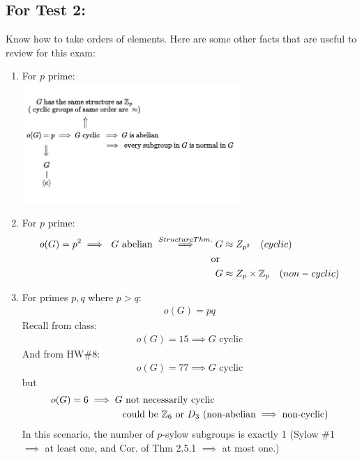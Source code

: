 \subsection*{For Test 2:}
Know how to take orders of elements. Here are some other facts that are useful to review for this exam:
\begin{enumerate}[label=(\arabic*.)]
    \item For $p$ prime: \\ \includegraphics[width=0.65\textwidth]{Figures/prime_order_properties_1.pdf}
    \item For $p$ prime: \\
    \begin{align}
        o(G)=p^2 \implies \ G\text{ abelian }\overset{Structure Thm.}{\implies} G &\approx Z_{p^2} \ \ \ (cyclic)\nonumber \\
        \ \ \ \text{ or } \nonumber \\
        G &\approx Z_{p}\times {\mathbb{ Z}}_{p} \ \ \ (non-cyclic) \nonumber
    \end{align}
    \item For primes $p,q$ where $p>q$: \\
    \begin{align}
        o(G)=pq \nonumber
    \end{align}
    Recall from class:
    \begin{align}
        o(G)=15 \implies G\text{ cyclic}\nonumber
    \end{align}
    And from HW\#8:
    \begin{align}
        o(G)=77\implies G\text{ cyclic}\nonumber
    \end{align}
    but 
    \begin{align}
        o(G)=6 \implies G &\text{ not necessarily cyclic} \nonumber \\
        &\text{could  be } \Z_6 \text{ or } D_3 \ (\text{non-abelian}\implies \text{non-cyclic}) \nonumber
    \end{align}
    In this scenario, the number of $p$-sylow subgroups is exactly 1 (Sylow \#1 $\implies $ at least one, and Cor. of Thm 2.5.1 $\implies$ at most one.) \\

\end{enumerate}
